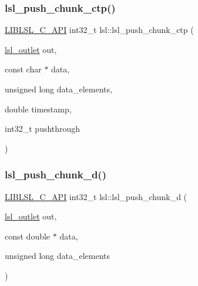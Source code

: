 \subsubsection{\texorpdfstring{lsl\+\_\+push\+\_\+chunk\+\_\+ctp()}{lsl\_push\_chunk\_ctp()}}
{\footnotesize\ttfamily \hyperlink{lsl__cpp_8h_aafd0ef1813e8be84a1420c4f1df64615}{L\+I\+B\+L\+S\+L\+\_\+\+C\+\_\+\+A\+PI} int32\+\_\+t lsl\+::lsl\+\_\+push\+\_\+chunk\+\_\+ctp (\begin{DoxyParamCaption}\item[{\hyperlink{namespacelsl_abcf512b0f66dacf86c10b165995fd50b}{lsl\+\_\+outlet}}]{out,  }\item[{const char $\ast$}]{data,  }\item[{unsigned long}]{data\+\_\+elements,  }\item[{double}]{timestamp,  }\item[{int32\+\_\+t}]{pushthrough }\end{DoxyParamCaption})}

\mbox{\label{namespacelsl_aba0e49750a9d56a0058b4287652043b1}} 
\subsubsection{\texorpdfstring{lsl\+\_\+push\+\_\+chunk\+\_\+d()}{lsl\_push\_chunk\_d()}}
{\footnotesize\ttfamily \hyperlink{lsl__cpp_8h_aafd0ef1813e8be84a1420c4f1df64615}{L\+I\+B\+L\+S\+L\+\_\+\+C\+\_\+\+A\+PI} int32\+\_\+t lsl\+::lsl\+\_\+push\+\_\+chunk\+\_\+d (\begin{DoxyParamCaption}\item[{\hyperlink{namespacelsl_abcf512b0f66dacf86c10b165995fd50b}{lsl\+\_\+outlet}}]{out,  }\item[{const double $\ast$}]{data,  }\item[{unsigned long}]{data\+\_\+elements }\end{DoxyParamCaption})}

\mbox{\label{namespacelsl_ae0c9d5ce50a5e9c7cd612063b82c7e6b}} 
